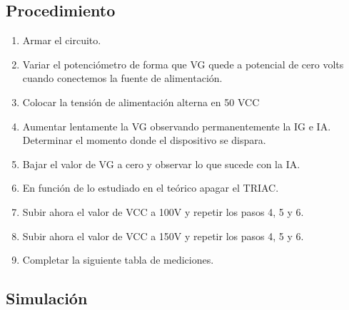 \subsection{Procedimiento}
\begin{enumerate}
  \item Armar el circuito.
  \item Variar el potenciómetro de forma que VG quede a potencial de cero volts
    cuando conectemos la fuente de alimentación.
  \item  Colocar la tensión de alimentación alterna en 50 VCC
  \item Aumentar lentamente la VG observando permanentemente la IG e IA. Determinar el momento donde el dispositivo se dispara.
  \item Bajar el valor de VG a cero y observar lo que sucede con la IA.
  \item En función de lo estudiado en el teórico apagar el TRIAC.
  \item Subir ahora el valor de VCC a 100V y repetir los pasos 4, 5 y 6.
  \item Subir ahora el valor de VCC a 150V y repetir los pasos 4, 5 y 6.
  \item Completar la siguiente tabla de mediciones.
\end{enumerate}
\subsection{Simulación}
